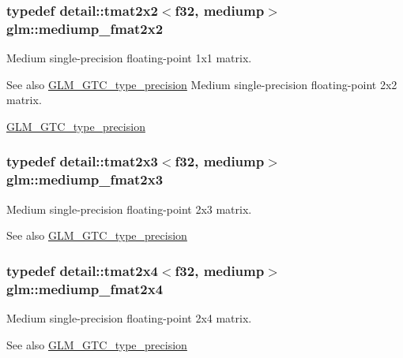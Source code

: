 \subsubsection[{\texorpdfstring{mediump\+\_\+fmat2x2}{mediump_fmat2x2}}]{\setlength{\rightskip}{0pt plus 5cm}typedef detail\+::tmat2x2$<$f32, mediump$>$ {\bf glm\+::mediump\+\_\+fmat2x2}}\hypertarget{group__gtc__type__precision_gae9af1d96efbaeeb5c5edd9c7b0a24fa5}{}\label{group__gtc__type__precision_gae9af1d96efbaeeb5c5edd9c7b0a24fa5}
Medium single-\/precision floating-\/point 1x1 matrix. \begin{DoxySeeAlso}{See also}
\hyperlink{group__gtc__type__precision}{G\+L\+M\+\_\+\+G\+T\+C\+\_\+type\+\_\+precision} Medium single-\/precision floating-\/point 2x2 matrix. 

\hyperlink{group__gtc__type__precision}{G\+L\+M\+\_\+\+G\+T\+C\+\_\+type\+\_\+precision} 
\end{DoxySeeAlso}
\subsubsection[{\texorpdfstring{mediump\+\_\+fmat2x3}{mediump_fmat2x3}}]{\setlength{\rightskip}{0pt plus 5cm}typedef detail\+::tmat2x3$<$f32, mediump$>$ {\bf glm\+::mediump\+\_\+fmat2x3}}\hypertarget{group__gtc__type__precision_gaae7081e19f495e7cdbf727e1550b95a8}{}\label{group__gtc__type__precision_gaae7081e19f495e7cdbf727e1550b95a8}
Medium single-\/precision floating-\/point 2x3 matrix. \begin{DoxySeeAlso}{See also}
\hyperlink{group__gtc__type__precision}{G\+L\+M\+\_\+\+G\+T\+C\+\_\+type\+\_\+precision} 
\end{DoxySeeAlso}
\subsubsection[{\texorpdfstring{mediump\+\_\+fmat2x4}{mediump_fmat2x4}}]{\setlength{\rightskip}{0pt plus 5cm}typedef detail\+::tmat2x4$<$f32, mediump$>$ {\bf glm\+::mediump\+\_\+fmat2x4}}\hypertarget{group__gtc__type__precision_ga8f793d90a5a6bea23c13ad195fcb5de2}{}\label{group__gtc__type__precision_ga8f793d90a5a6bea23c13ad195fcb5de2}
Medium single-\/precision floating-\/point 2x4 matrix. \begin{DoxySeeAlso}{See also}
\hyperlink{group__gtc__type__precision}{G\+L\+M\+\_\+\+G\+T\+C\+\_\+type\+\_\+precision} 
\end{DoxySeeAlso}
